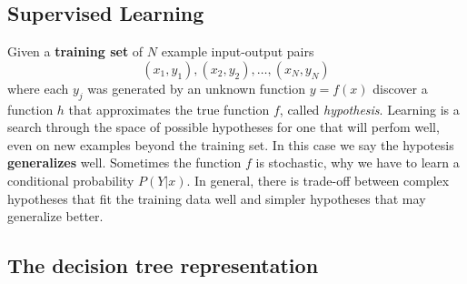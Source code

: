 \documentclass{scrartcl}
\begin{document}
\subsection{Supervised Learning}
Given a \textbf{training set} of \(N\) example input-output pairs
\[(x_1, y_1), (x_2, y_2), \dots, (x_N, y_N)\]
where each \(y_j\) was generated by an unknown function \(y = f(x)\) discover a function \(h\) that approximates the true function \(f\), called \textit{hypothesis}. Learning is a search through the space of possible hypotheses for one that will perfom well, even on new examples beyond the training set. In this case we say the hypotesis \textbf{generalizes} well. Sometimes the function \(f\) is stochastic, why we have to learn a conditional probability \(P(Y|x)\). In general, there is trade-off between complex hypotheses that fit the training data well and simpler hypotheses that may generalize better.

\subsection{The decision tree representation}
\end{document}
